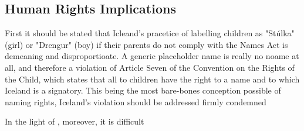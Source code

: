 \subsection{Human Rights Implications}

First it should be stated that Icleand's pracetice of labelling children as
"Stúlka" (girl) or "Drengur" (boy) if their parents do not comply with the
Names Act is demeaning and disproportioate. A generic placeholder name is
really no noame at all, and therefore a violation of Article Seven of the
Convention on the Rights of the Child, which states that all to children have
the right to a name and to which Iceland is a signatory. This being the most
bare-bones conception possible of naming rights, Iceland's violation should be
addressed firmly condemned 

In the light of \parencite{raihman10}, moreover, it is difficult
